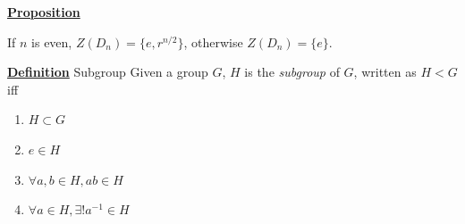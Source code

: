 \documentclass[a4paper, 12pt]{article}
\begin{document}
\vspace{5mm}
\textbf{\underline{Proposition}}

If $n$ is even, $Z(D_n) = \{e, r^{n/2}\}$, otherwise $Z(D_n) = \{e\}$.

\vspace{5mm}

\textbf{\underline{Definition}} Subgroup
Given a group $G$, $H$ is the \textit{subgroup} of $G$, written as $H < G$ iff
\begin{enumerate}
    \item $H\subset G$
    \item $e\in H$
    \item $\forall a, b\in H, ab\in H$
    \item $\forall a\in H, \exists!a^{-1}\in H$
\end{enumerate}
\end{document}

